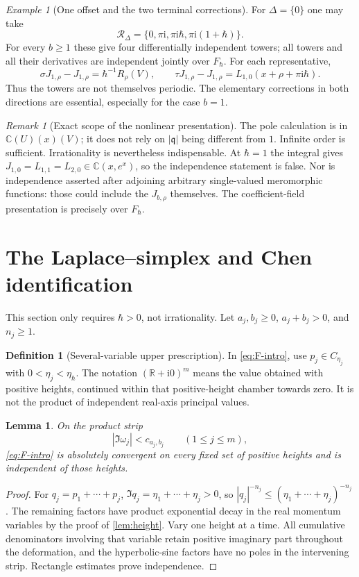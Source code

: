 \documentclass[11pt]{article}
\numberwithin{equation}{section}
\newtheorem{lemma}[lemma]{Lemma}
\theoremstyle{definition}
\newtheorem{definition}[definition]{Definition}
\theoremstyle{remark}
\newtheorem{remark}[remark]{Remark}
\newtheorem{example}[example]{Example}
\newcommand{\C}{\mathbb C}
\newcommand{\R}{\mathbb R}
\newcommand{\ii}{\mathrm i}
\newcommand{\qh}{\hbar}
\begin{document}
\begin{example}[One offset and the two terminal corrections]
For $\Delta=\{0\}$ one may take
\[
 \mathscr R_\Delta=\{0,\pi\ii,\pi\ii\qh,\pi\ii(1+\qh)\}.
\]
For every $b\geq1$ these give four differentially independent towers; all
towers and all their derivatives are independent jointly over $F_\qh$.
For each representative,
\[
 \sigma J_{1,\rho}-J_{1,\rho}=\qh^{-1}R_\rho(V),\qquad
 \tau J_{1,\rho}-J_{1,\rho}=L_{1,0}(x+\rho+\pi\ii\qh).
\]
Thus the towers are not themselves periodic. The elementary corrections in
both directions are essential, especially for the case $b=1$.
\end{example}

\begin{remark}[Exact scope of the nonlinear presentation]
The pole calculation is in $\C(U)(x)(V)$; it does not rely on $|\mathfrak q|$
being different from $1$. Infinite order is sufficient. Irrationality is
nevertheless indispensable. At $\qh=1$ the integral gives
$J_{1,0}=L_{1,1}=L_{2,0}\in\C(x,e^x)$, so the independence statement is false.
Nor is independence asserted after adjoining arbitrary single-valued
meromorphic functions: those could include the $J_{b,\rho}$ themselves.
The coefficient-field presentation is precisely over $F_\qh$.
\end{remark}

\section{The Laplace--simplex and Chen identification}\label{sec:laplace}

This section only requires $\qh>0$, not irrationality. Let
$a_j,b_j\geq0$, $a_j+b_j>0$, and $n_j\geq1$.

\begin{definition}[Several-variable upper prescription]
In \eqref{eq:F-intro}, use $p_j\in C_{\eta_j}$ with
$0<\eta_j<\eta_{\qh}$. The notation $(\R+\ii0)^m$ means the value obtained
with positive heights, continued within that positive-height chamber towards
zero. It is not the product of independent real-axis principal values.
\end{definition}

\begin{lemma}\label{lem:multiheight}
On the product strip
\begin{equation}\label{eq:strip}
 |\Im\omega_j|<c_{a_j,b_j}\qquad(1\leq j\leq m),
\end{equation}
\eqref{eq:F-intro} is absolutely convergent on every fixed set of positive
heights and is independent of those heights.
\end{lemma}
\begin{proof}
For $q_j=p_1+\cdots+p_j$,
$\Im q_j=\eta_1+\cdots+\eta_j>0$, so
$|q_j|^{-n_j}\leq(\eta_1+\cdots+\eta_j)^{-n_j}$.
The remaining factors have product exponential decay in the real momentum
variables by the proof of \cref{lem:height}. Vary one height at a time.
All cumulative denominators involving that variable retain positive imaginary
part throughout the deformation, and the hyperbolic-sine factors have no poles
in the intervening strip. Rectangle estimates prove independence.
\end{proof}
\end{document}
